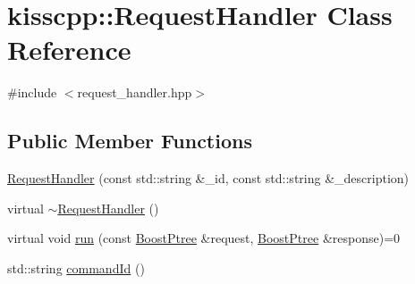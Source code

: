 \hypertarget{classkisscpp_1_1_request_handler}{\section{kisscpp\-:\-:Request\-Handler Class Reference}
\label{classkisscpp_1_1_request_handler}
}


{\ttfamily \#include $<$request\-\_\-handler.\-hpp$>$}

\subsection*{Public Member Functions}
\begin{DoxyCompactItemize}
\item 
\hyperlink{classkisscpp_1_1_request_handler_a0c726aac7632902905126e5d381dd12e}{Request\-Handler} (const std\-::string \&\-\_\-id, const std\-::string \&\-\_\-description)
\item 
virtual \hyperlink{classkisscpp_1_1_request_handler_afc972ed679cfcc264f8694083be0273e}{$\sim$\-Request\-Handler} ()
\item 
virtual void \hyperlink{classkisscpp_1_1_request_handler_a3606f772c07297826847a8e36226cdaa}{run} (const \hyperlink{boost__ptree_8hpp_ab36820650b8e0db36402aea80485633c}{Boost\-Ptree} \&request, \hyperlink{boost__ptree_8hpp_ab36820650b8e0db36402aea80485633c}{Boost\-Ptree} \&response)=0
\item 
std\-::string \hyperlink{classkisscpp_1_1_request_handler_aa67ecd0d2dc726b1e76ae1e29329aed3}{command\-Id} ()
\end{DoxyCompactItemize}


